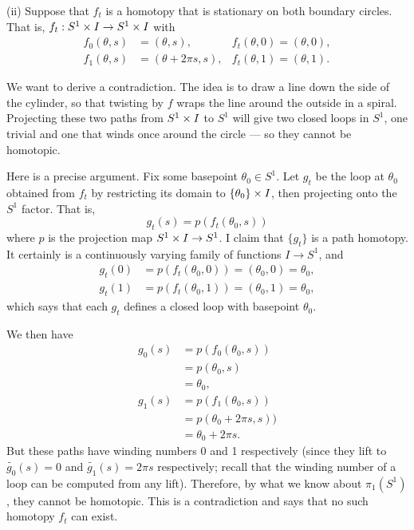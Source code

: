 (ii) Suppose that $f_t$ is a homotopy that is stationary on both
boundary circles.  That is, $f_t:S^1\times I\to S^1\times I$ with
\begin{align*}
f_0(\theta,s) &= (\theta,s),         & f_t(\theta,0) = (\theta,0),\\
f_1(\theta,s) &= (\theta+2\pi s, s), & f_t(\theta,1) = (\theta,1).
\end{align*}

We want to derive a contradiction. The idea is to draw a line down
the side of the cylinder, so that
twisting by $f$ wraps the line around the outside in a spiral.
Projecting
these two paths from $S^1\times I$ to $S^1$ will give two closed loops in $S^1$,
one trivial and one that winds once around the circle --- so they cannot
be homotopic.

Here is a precise argument.
Fix some basepoint $\theta_0\in S^1$.  Let $g_t$ be the loop at
$\theta_0$ obtained from $f_t$ by restricting its domain to
$\{\theta_0\}\times I$, then projecting onto the $S^1$ factor.  That is,
  $$g_t(s)=p(f_t(\theta_0,s))$$
where $p$ is the projection map $S^1\times I\to S^1$.  I claim that
$\{g_t\}$ is a path homotopy.  It certainly is a continuously varying
family of functions $I\to S^1$, and
\begin{align*}
g_t(0) &= p(f_t(\theta_0,0)) = (\theta_0,0) = \theta_0,\\
g_t(1) &= p(f_t(\theta_0,1)) = (\theta_0,1) = \theta_0,
\end{align*}
which says that each $g_t$ defines a closed loop with basepoint $\theta_0$.

We then have
\begin{align*}
g_0(s) &= p(f_0(\theta_0,s))\\
       &= p(\theta_0,s)\\
       &= \theta_0,\\
g_1(s) &= p(f_1(\theta_0,s))\\
       &= p(\theta_0+2\pi s,s))\\
       &= \theta_0+2\pi s.
\end{align*}
But these paths have winding numbers 0 and 1 respectively (since they lift
to $\widetilde{g_0}(s)=0$ and $\widetilde{g_1}(s)=2\pi s$ respectively;
recall that the winding number of a loop can be computed from any lift).
Therefore, by what we
know about $\pi_1(S^1)$, they cannot be homotopic.  This is a contradiction and says
that no such homotopy $f_t$ can exist.


